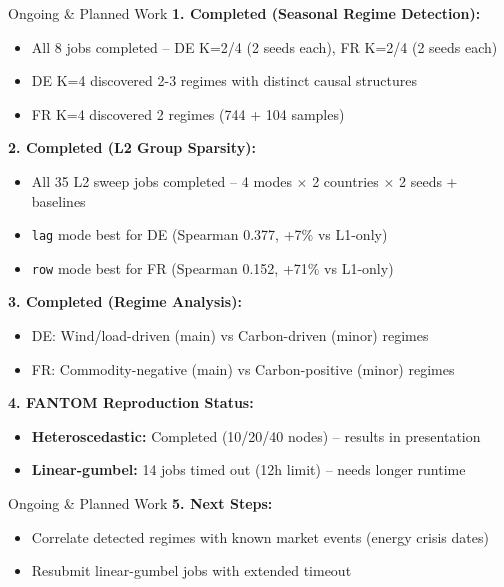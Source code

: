 \documentclass[aspectratio=169]{beamer}
\begin{document}
\begin{frame}{Ongoing \& Planned Work}
\textbf{1. Completed (Seasonal Regime Detection):}
\begin{itemize}
    \item \textcolor{reprogreen}{All 8 jobs completed} -- DE K=2/4 (2 seeds each), FR K=2/4 (2 seeds each)
    \item \textcolor{reprogreen}{DE K=4 discovered 2-3 regimes} with distinct causal structures
    \item \textcolor{reprogreen}{FR K=4 discovered 2 regimes} (744 + 104 samples)
\end{itemize}

\textbf{2. Completed (L2 Group Sparsity):}
\begin{itemize}
    \item \textcolor{reprogreen}{All 35 L2 sweep jobs completed} -- 4 modes $\times$ 2 countries $\times$ 2 seeds + baselines
    \item \textcolor{reprogreen}{\texttt{lag} mode best for DE} (Spearman 0.377, +7\% vs L1-only)
    \item \textcolor{reprogreen}{\texttt{row} mode best for FR} (Spearman 0.152, +71\% vs L1-only)
\end{itemize}

\textbf{3. Completed (Regime Analysis):}
\begin{itemize}
    \item \textcolor{reprogreen}{DE: Wind/load-driven (main) vs Carbon-driven (minor) regimes}
    \item \textcolor{reprogreen}{FR: Commodity-negative (main) vs Carbon-positive (minor) regimes}
\end{itemize}

\textbf{4. FANTOM Reproduction Status:}
\begin{itemize}
    \item \textbf{Heteroscedastic:} Completed (10/20/40 nodes) -- results in presentation
    \item \textbf{Linear-gumbel:} 14 jobs timed out (12h limit) -- needs longer runtime
\end{itemize}
\end{frame}

\begin{frame}{Ongoing \& Planned Work}
\textbf{5. Next Steps:}
\begin{itemize}
    \item Correlate detected regimes with known market events (energy crisis dates)
    \item Resubmit linear-gumbel jobs with extended timeout
\end{itemize}
\end{frame}
\end{document}
